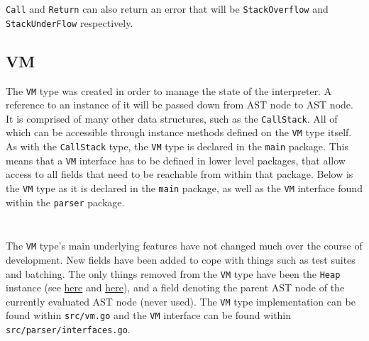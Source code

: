 \inputminted[firstline=140, lastline=151, autogobble, breaklines, tabsize=4]{go}{../../src/call.go}

\verb|Call| and \verb|Return| can also return an error that will be \verb|StackOverflow| and \verb|StackUnderFlow| respectively.

\subsection{VM}
\label{sec:data-structures-vm}

The \verb|VM| type was created in order to manage the state of the interpreter. A reference to an instance of it will be passed down from AST node to AST node. It is comprised of many other data structures, such as the \verb|CallStack|. All of which can be accessible through instance methods defined on the \verb|VM| type itself. As with the \verb|CallStack| type, the \verb|VM| type is declared in the \verb|main| package. This means that a \verb|VM| interface has to be defined in lower level packages, that allow access to all fields that need to be reachable from within that package. Below is the \verb|VM| type as it is declared in the \verb|main| package, as well as the \verb|VM| interface found within the \verb|parser| package.

\inputminted[firstline=15, lastline=37, autogobble, breaklines, tabsize=4]{go}{../../src/vm.go}

\inputminted[firstline=18, lastline=60, autogobble, breaklines, tabsize=4]{go}{../../src/parser/interfaces.go}



The \verb|VM| type's main underlying features have not changed much over the course of development. New fields have been added to cope with things such as test suites and batching. The only things removed from the \verb|VM| type have been the \verb|Heap| instance (see \hyperref[sec:data-structures-frames-callstack]{here} and \hyperref[sec:data-structures-heap]{here}), and a field denoting the parent AST node of the currently evaluated AST node (never used). The \verb|VM| type implementation can be found within \verb|src/vm.go| and the \verb|VM| interface can be found within \verb|src/parser/interfaces.go|.

